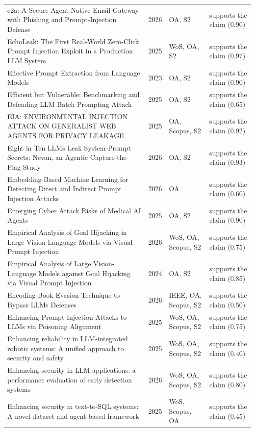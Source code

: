 \begin{longtable}{@{}%
  >{\raggedright\arraybackslash}p{}c%
  >{\raggedright\arraybackslash}p{}%
  >{\raggedright\arraybackslash}p{}@{}}
e2a: A Secure Agent-Native Email Gateway with Phishing and Prompt-Injection Defense & 2026 & OA, S2 & supports the claim (0.90) \\
EchoLeak: The First Real-World Zero-Click Prompt Injection Exploit in a Production LLM System & 2025 & WoS, OA, S2 & supports the claim (0.97) \\
Effective Prompt Extraction from Language Models & 2023 & OA, S2 & supports the claim (0.90) \\
Efficient but Vulnerable: Benchmarking and Defending LLM Batch Prompting Attack & 2025 & OA, S2 & supports the claim (0.65) \\
EIA: ENVIRONMENTAL INJECTION ATTACK ON GENERALIST WEB AGENTS FOR PRIVACY LEAKAGE & 2025 & OA, Scopus, S2 & supports the claim (0.92) \\
Eight in Ten LLMs Leak System-Prompt Secrets: Nevan, an Agentic Capture-the-Flag Study & 2026 & OA, S2 & supports the claim (0.93) \\
Embedding-Based Machine Learning for Detecting Direct and Indirect Prompt Injection Attacks & 2026 & OA & supports the claim (0.60) \\
Emerging Cyber Attack Risks of Medical AI Agents & 2025 & OA, S2 & supports the claim (0.90) \\
Empirical Analysis of Goal Hijacking in Large Vision-Language Models via Visual Prompt Injection & 2026 & WoS, OA, Scopus, S2 & supports the claim (0.75) \\
Empirical Analysis of Large Vision-Language Models against Goal Hijacking via Visual Prompt Injection & 2024 & OA, S2 & supports the claim (0.85) \\
Encoding Book Evasion Technique to Bypass LLMs Defenses & 2026 & IEEE, OA, Scopus, S2 & supports the claim (0.50) \\
Enhancing Prompt Injection Attacks to LLMs via Poisoning Alignment & 2025 & WoS, OA, Scopus, S2 & supports the claim (0.75) \\
Enhancing reliability in LLM-integrated robotic systems: A unified approach to security and safety & 2025 & WoS, OA, Scopus, S2 & supports the claim (0.40) \\
Enhancing security in LLM applications: a performance evaluation of early detection systems & 2026 & WoS, OA, Scopus, S2 & supports the claim (0.80) \\
Enhancing security in text-to-SQL systems: A novel dataset and agent-based framework & 2025 & WoS, Scopus, OA & supports the claim (0.45) \\

\end{longtable}
